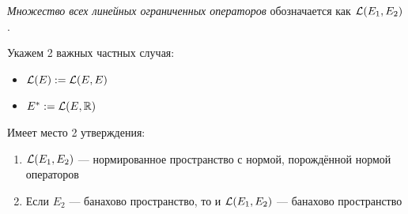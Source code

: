 \begin{definition}
	\textit{Множество всех линейных ограниченных операторов} обозначается как $\mathcal{L}(E_1, E_2)$.
\end{definition}

\begin{note}
	Укажем 2 важных частных случая:
	\begin{itemize}
		\item $\mathcal{L}(E) := \mathcal{L}(E, E)$
		
		\item $E^* := \mathcal{L}(E, \mathbb{R})$
	\end{itemize}
\end{note}

\begin{theorem}
	Имеет место 2 утверждения:
	\begin{enumerate}
		\item $\mathcal{L}(E_1, E_2)$ --- нормированное пространство с нормой, порождённой нормой операторов
		
		\item Если $E_2$ --- банахово пространство, то и $\mathcal{L}(E_1, E_2)$ --- банахово пространство
	\end{enumerate}
\end{theorem}

